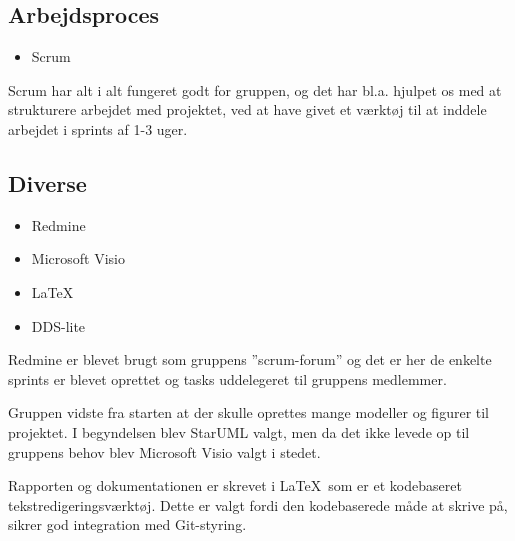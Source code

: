 \subsection*{Arbejdsproces} 
\begin{itemize}
  \item Scrum
\end{itemize}
Scrum har alt i alt fungeret godt for gruppen, og det har bl.a. hjulpet os med at strukturere arbejdet med projektet, ved at have givet et værktøj til at inddele arbejdet i sprints af 1-3 uger. 

\subsection*{Diverse}\label{subsec:udviklingdiverse} 
\begin{itemize}
  \item Redmine
  \item Microsoft Visio
  \item \LaTeX
  \item DDS-lite
\end{itemize}
Redmine er blevet brugt som gruppens ''scrum-forum'' og det er her de enkelte sprints er blevet oprettet og tasks uddelegeret til gruppens medlemmer.

Gruppen vidste fra starten at der skulle oprettes mange modeller og figurer til projektet. I begyndelsen blev StarUML valgt, men da det ikke levede op til gruppens behov blev Microsoft Visio valgt i stedet.

Rapporten og dokumentationen er skrevet i \LaTeX\ som er et kodebaseret tekstredigeringsværktøj. Dette er valgt fordi den kodebaserede måde at skrive på, sikrer god integration med Git-styring.
